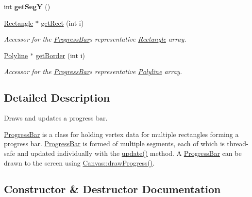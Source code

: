 \begin{DoxyCompactItemize}
\item 
\hypertarget{classtsgl_1_1_progress_bar_a7efb6be08196ad2b48d4417a93d750ad}{}int {\bfseries get\+Seg\+Y} ()\label{classtsgl_1_1_progress_bar_a7efb6be08196ad2b48d4417a93d750ad}

\item 
\hyperlink{classtsgl_1_1_rectangle}{Rectangle} $\ast$ \hyperlink{classtsgl_1_1_progress_bar_a6bdb686cc77b4979698b52f17652499d}{get\+Rect} (int i)
\begin{DoxyCompactList}\small\item\em Accessor for the \hyperlink{classtsgl_1_1_progress_bar}{Progress\+Bar}\textquotesingle{}s representative \hyperlink{classtsgl_1_1_rectangle}{Rectangle} array. \end{DoxyCompactList}\item 
\hyperlink{classtsgl_1_1_polyline}{Polyline} $\ast$ \hyperlink{classtsgl_1_1_progress_bar_a3e72a87858a0a1da52f7297f17763e29}{get\+Border} (int i)
\begin{DoxyCompactList}\small\item\em Accessor for the \hyperlink{classtsgl_1_1_progress_bar}{Progress\+Bar}\textquotesingle{}s representative \hyperlink{classtsgl_1_1_polyline}{Polyline} array. \end{DoxyCompactList}\end{DoxyCompactItemize}


\subsection{Detailed Description}
Draws and updates a progress bar. 

\hyperlink{classtsgl_1_1_progress_bar}{Progress\+Bar} is a class for holding vertex data for multiple rectangles forming a progress bar. \hyperlink{classtsgl_1_1_progress_bar}{Progress\+Bar} is formed of multiple segments, each of which is thread-\/safe and updated individually with the \hyperlink{classtsgl_1_1_progress_bar_a0c3a967ebc71dabfe21b99c3de23eee7}{update()} method. A \hyperlink{classtsgl_1_1_progress_bar}{Progress\+Bar} can be drawn to the screen using \hyperlink{classtsgl_1_1_canvas_aea792059486ebe6d25d7f81bdadf751d}{Canvas\+::draw\+Progress()}. 

\subsection{Constructor \& Destructor Documentation}
\hypertarget{classtsgl_1_1_progress_bar_aee54b95dea3f338d0d54463fc9a36ee7}{}
